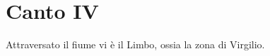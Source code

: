 \documentclass[preview]{standalone}
\begin{document}
\genpage

\section{Canto IV}

\begin{plainhtml}
    Attraversato il fiume vi è il Limbo, ossia la zona di Virgilio.
\end{plainhtml}
\end{document}
